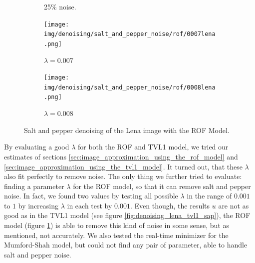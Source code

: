 \documentclass{scrreprt}
\begin{document}
\begin{figure}[!ht]
\begin{subfigure}[b]{0.24\textwidth}
                    \caption{25\% noise.}
                \end{subfigure}
                \begin{subfigure}[b]{0.24\textwidth}
                    \texttt{[image: img/denoising/salt\_and\_pepper\_noise/rof/0007lena.png]}
                    \caption{$\lambda = 0.007$}
                \end{subfigure}
                \begin{subfigure}[b]{0.24\textwidth}
                    \texttt{[image: img/denoising/salt\_and\_pepper\_noise/rof/0008lena.png]}
                    \caption{$\lambda = 0.008$}
                \end{subfigure}
                \caption[Salt and pepper denoising example: ROF.]{Salt and pepper denoising of the Lena image with the ROF Model.}
            \label{fig:denoising_lena_rof_sap}
            \end{figure}

        By evaluating a good $\lambda$ for both the ROF and TVL1 model, we tried our estimates of sections \ref{sec:image_approximation_using_the_rof_model} and \ref{sec:image_approximation_using_the_tvl1_model}. It turned out, that these $\lambda$ also fit perfectly to remove noise. The only thing we further tried to evaluate: finding a parameter $\lambda$ for the ROF model, so that it can remove salt and pepper noise. In fact, we found two values by testing all possible $\lambda$ in the range of $0.001$ to $1$ by increasing $\lambda$ in each test by $0.001$. Even though, the results $u$ are not as good as in the TVL1 model (see figure \ref{fig:denoising_lena_tvl1_sap}), the ROF model (figure \ref{fig:denoising_lena_rof_sap}) is able to remove this kind of noise in some sense, but as mentioned, not accurately. We also tested the real-time minimizer for the Mumford-Shah model, but could not find any pair of parameter, able to handle salt and pepper noise.
\end{document}
